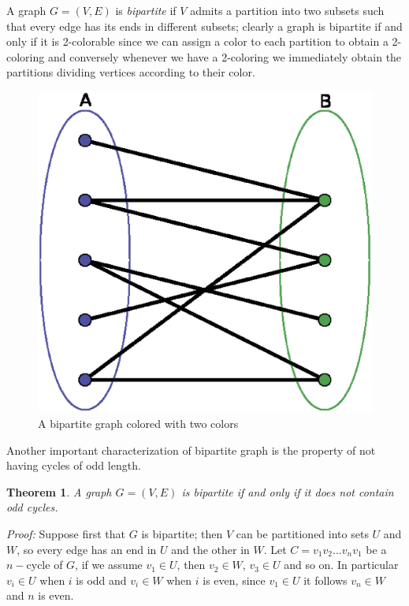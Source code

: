 \documentclass[a4paper,12pt,oneside]{book}
\newtheorem{theorem}{Theorem}[chapter]
\begin{document}
A graph $G=(V,E)$ is \textit{bipartite} if $V$ admits a partition into two subsets such that every edge has its ends in different subsets; clearly a graph is bipartite if and only if it is 2-colorable since we can assign a color to each partition to obtain a 2-coloring and conversely whenever we have a 2-coloring we immediately obtain the partitions dividing vertices according to their color. 
\begin{figure} 
\begin{center}
\includegraphics[scale=0.28]{bipartite.eps}
\caption{A bipartite graph colored with two colors}\label{bip}
\end{center}
\end{figure}

\newpage
Another important characterization of bipartite graph is the property of not having cycles of odd length.
\begin{theorem}
A graph $G=(V,E)$ is bipartite if and only if it does not contain odd cycles.
\end{theorem}
\textit{Proof:}
Suppose first that $G$ is bipartite; then $V$ can be partitioned into sets $U$ and $W$, so every edge has an end in $U$ and the other in $W$. Let $C=v_1v_2...v_nv_1$ be a $n-$cycle of $G$, if we assume $v_1\in U$, then $v_2\in W$, $v_3\in U$ and so on.
In particular $v_i\in U $ when $i$ is odd and $v_i\in W$ when $i$ is even, since $v_1\in U$ it follows $v_n\in W$ and $n$ is even.
\end{document}
